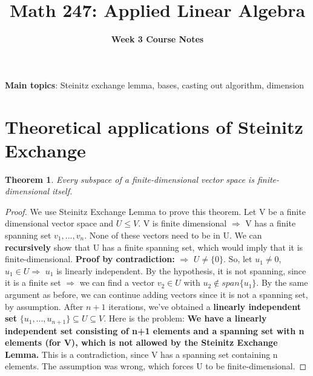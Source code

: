 \documentclass[a4paper, 12pt]{article}
\title{\textbf{ Math 247: Applied Linear Algebra } \vspace{-2ex}}
\author{\textbf{Week 3 Course Notes} \vspace{-2ex}}
\date{}
\newtheorem{theorem}{Theorem}
\renewcommand{\arraystretch}{1.0}
\theoremstyle{definition}
\theoremstyle{definition}
\theoremstyle{definition}
\theoremstyle{definition}
\begin{document}
\maketitle
\textbf{Main topics}: Steinitz exchange lemma, bases, casting out algorithm, dimension

\pagestyle{fancy}
\rhead{}
\lfoot{}
\cfoot{}
\renewcommand{\headrulewidth}{0.4pt}
\renewcommand{\footrulewidth}{0.4pt}
\setlength{\tabcolsep}{0.5em} %
{\renewcommand{\arraystretch}{1.2}%

\section{Theoretical applications of Steinitz Exchange}

\begin{theorem}
	Every subspace of a finite-dimensional vector space is finite-dimensional itself. 
\end{theorem}
\begin{proof}
	We use Steinitz Exchange Lemma to prove this theorem. Let V be a finite dimensional vector space and $U \leq V$. V is finite dimensional $\Rightarrow$ V has a finite spanning set $v_1, ..., v_n$. None of these vectors need to be in U. We can \textbf{recursively} show that U has a finite spanning set, which would imply that it is finite-dimensional. 
	\newline 
	\newline
	\textbf{Proof by contradiction:} $\Rightarrow$ $U \neq \{ 0 \}$. So, let $u_1 \neq 0$, $u_1 \in U \Rightarrow$ $u_1$ is linearly independent. By the hypothesis, it is not spanning, since it is a finite set $\Rightarrow$ we can find a vector $v_2 \in U$ with $u_2 \notin span \{ u_1 \}$. By the same argument as before, we can continue adding vectors since it is not a spanning set, by assumption. 
	\newline 
	\newline 
	After $n+1$ iterations, we've obtained a \textbf{linearly independent set} $\{ u_1,..., u_{n+1} \} \subseteq U \subseteq V$. Here is the problem: \textbf{We have a linearly independent set consisting of n+1 elements and a spanning set with n elements (for V), which is not allowed by the Steinitz Exchange Lemma.} This is a contradiction, since V has a spanning set containing n elements. The assumption was wrong, which forces U to be finite-dimensional. 
\end{proof}

}
\end{document}
